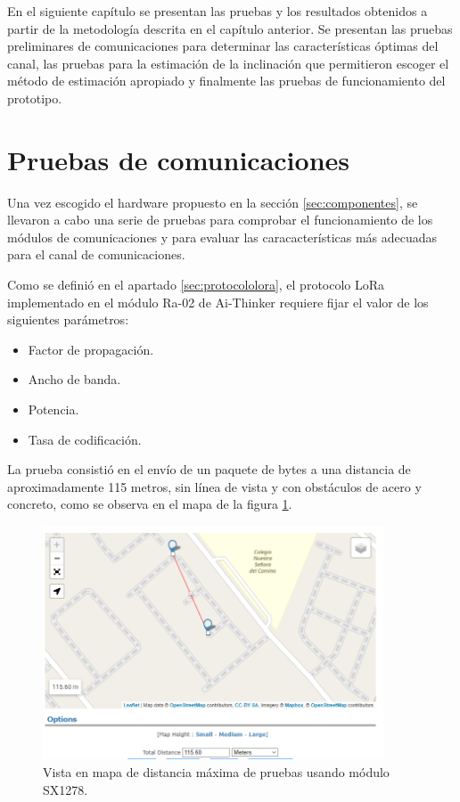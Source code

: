 En el siguiente capítulo se presentan las pruebas y los resultados obtenidos a partir de la metodología descrita en el capítulo anterior. Se presentan las pruebas preliminares de comunicaciones para determinar las características óptimas del canal, las pruebas para la estimación de la inclinación que permitieron escoger el método de estimación apropiado y finalmente las pruebas de funcionamiento del prototipo.

\section{Pruebas de comunicaciones}



Una vez escogido el hardware propuesto en la sección \ref{sec:componentes}, se llevaron a cabo una serie de pruebas  para comprobar el funcionamiento de los módulos de comunicaciones y para evaluar las caracacterísticas más adecuadas para el canal de comunicaciones. 

Como se definió en el apartado \ref{sec:protocololora}, el protocolo LoRa implementado en el módulo Ra-02 de Ai-Thinker requiere fijar el valor de los siguientes parámetros:

\begin{itemize}
    \item Factor de propagación.
    \item Ancho de banda.
    \item Potencia.
    \item Tasa de codificación.
\end{itemize}

La prueba consistió en el envío de un paquete de bytes a una distancia de aproximadamente 115 metros, sin línea de vista y con obstáculos de acero y concreto, como se observa en el mapa de la figura \ref{fig:mapalora}.

\begin{figure}[H]
    \centering
    \includegraphics[width = 0.9\textwidth]{imagenes/cap3_resultados/Pruebas LoRa/MapaLora.png}
    \caption{Vista en mapa de distancia máxima de pruebas usando módulo SX1278.}
    \label{fig:mapalora}
\end{figure}

